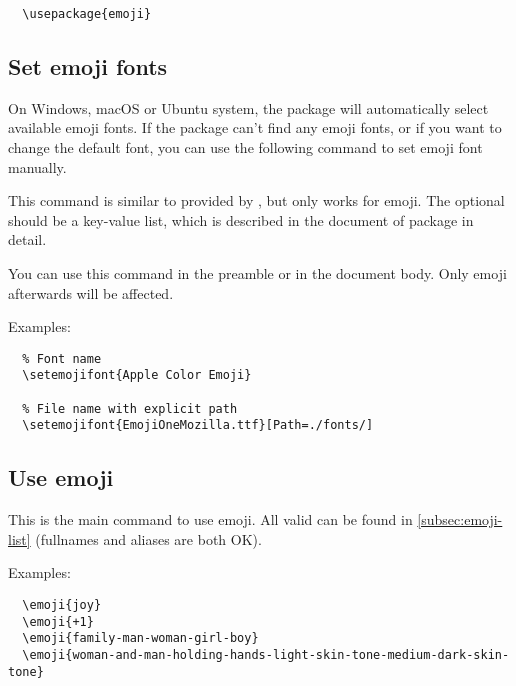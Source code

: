 \documentclass{l3doc}
\newcounter { emoji }
\begin{document}
\begin{verbatim}
  \usepackage{emoji}
\end{verbatim}

\subsection{ Set emoji fonts}

On Windows, macOS or Ubuntu system, the  package will automatically select available
emoji fonts. If the package can't find any emoji fonts, or if you want to change the default font,
you can use the following command to set emoji font manually.

\begin{function}{\setemojifont}
  \begin{syntax}
  \end{syntax}
  This command is similar to  provided by , but only works for
  emoji. The optional  should be a key-value list, which is described in the
  document of  package in detail.

  You can use this command in the preamble or in the document body. Only emoji afterwards will
  be affected.
\end{function}

Examples:

\begin{verbatim}
  % Font name
  \setemojifont{Apple Color Emoji}

  % File name with explicit path
  \setemojifont{EmojiOneMozilla.ttf}[Path=./fonts/]
\end{verbatim}

\subsection{ Use emoji}

\begin{function}{\emoji}
  \begin{syntax}
  \end{syntax}
  This is the main command to use emoji. All valid  can be found in
  \autoref{subsec:emoji-list} (fullnames and aliases are both OK).
\end{function}

Examples:

\begin{verbatim}
  \emoji{joy}
  \emoji{+1}
  \emoji{family-man-woman-girl-boy}
  \emoji{woman-and-man-holding-hands-light-skin-tone-medium-dark-skin-tone}
\end{verbatim}
\end{document}
